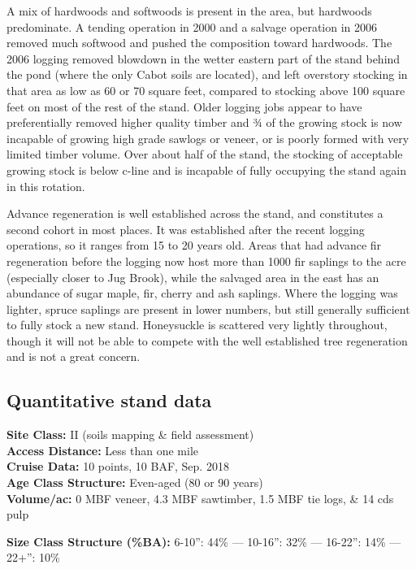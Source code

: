 \documentclass[]{tufte-handout}
\begin{document}
A mix of hardwoods and softwoods is present in the area, but hardwoods
predominate. A tending operation in 2000 and a salvage operation in 2006
removed much softwood and pushed the composition toward hardwoods. The
2006 logging removed blowdown in the wetter eastern part of the stand
behind the pond (where the only Cabot soils are located), and left
overstory stocking in that area as low as 60 or 70 square feet, compared
to stocking above 100 square feet on most of the rest of the stand.
Older logging jobs appear to have preferentially removed higher quality
timber and ¾ of the growing stock is now incapable of growing high grade
sawlogs or veneer, or is poorly formed with very limited timber volume.
Over about half of the stand, the stocking of acceptable growing stock
is below c-line and is incapable of fully occupying the stand again in
this rotation.

Advance regeneration is well established across the stand, and
constitutes a second cohort in most places. It was established after the
recent logging operations, so it ranges from 15 to 20 years old. Areas
that had advance fir regeneration before the logging now host more than
1000 fir saplings to the acre (especially closer to Jug Brook), while
the salvaged area in the east has an abundance of sugar maple, fir,
cherry and ash saplings. Where the logging was lighter, spruce saplings
are present in lower numbers, but still generally sufficient to fully
stock a new stand. Honeysuckle is scattered very lightly throughout,
though it will not be able to compete with the well established tree
regeneration and is not a great concern.

\subsection{Quantitative stand data}\label{quantitative-stand-data-1}

\textbf{Site Class: } II (soils mapping \& field assessment)\\
\textbf{Access Distance: } Less than one mile\\
\textbf{Cruise Data: } 10 points, 10 BAF, Sep. 2018\\
\textbf{Age Class Structure: } Even-aged (80 or 90 years)\\
\textbf{Volume/ac: } 0 MBF veneer, 4.3 MBF sawtimber, 1.5 MBF tie logs,
\& 14 cds pulp

\textbf{Size Class Structure (\%BA): } 6-10'': 44\% --- 10-16'': 32\%
--- 16-22'': 14\% --- 22+'': 10\%
\end{document}
